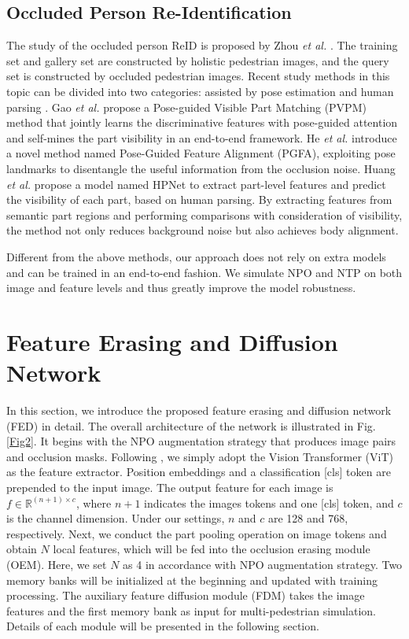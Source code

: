 \documentclass[10pt,twocolumn,letterpaper]{article}
\begin{document}
\subsection{Occluded Person Re-Identification}
The study of the occluded person ReID is proposed by Zhou \emph{et al.} \cite{zhuo2018occluded}. The training set and gallery set are constructed by holistic pedestrian images, and the query set is constructed by occluded pedestrian images. Recent study methods in this topic can be divided into two categories: assisted by pose estimation \cite{he2019foreground,he2020guided} and human parsing \cite{huang2020human,yu2021neighbourhood}.
Gao \emph{et al.} propose a Pose-guided Visible Part Matching (PVPM) method that jointly learns the discriminative features with pose-guided attention and self-mines the part visibility in an end-to-end framework. He \emph{et al.} \cite{he2020guided} introduce a novel method named Pose-Guided Feature Alignment (PGFA), exploiting pose landmarks to disentangle the useful information from the occlusion noise.
Huang \emph{et al.} propose a model named HPNet to extract part-level features and predict the visibility of each part, based on human parsing. By extracting features from semantic part regions and performing comparisons with consideration of visibility, the method not only reduces background noise but also achieves body alignment.


Different from the above methods, our approach does not rely on extra models and can be trained in an end-to-end fashion. We simulate NPO and NTP on both image and feature levels and thus greatly improve the model robustness.


\section{Feature Erasing and Diffusion Network}
In this section, we introduce the proposed feature erasing and diffusion network (FED) in detail. The overall architecture of the network is illustrated in Fig.\ref{Fig2}. 
It begins with the NPO augmentation strategy that produces image pairs and occlusion masks. Following \cite{he2021transreid}, we simply adopt the Vision Transformer (ViT)\cite{dosovitskiy2020image} as the feature extractor. Position embeddings and a classification [cls] token are prepended to the input image. 
The output feature for each image is $f \in \mathbb{R}^{(n+1) \times c}$, where $n+1$ indicates the images tokens and one [cls] token, and $c$ is the channel dimension. Under our settings, $n$ and $c$ are 128 and 768, respectively. 
Next, we conduct the part pooling operation on image tokens and obtain $N$ local features, which will be fed into the occlusion erasing module (OEM). Here, we set $N$ as 4 in accordance with NPO augmentation strategy. Two memory banks will be initialized at the beginning and updated with training processing. The auxiliary feature diffusion module (FDM) takes the image features and the first memory bank as input for multi-pedestrian simulation. Details of each module will be presented in the following section. 
\end{document}
